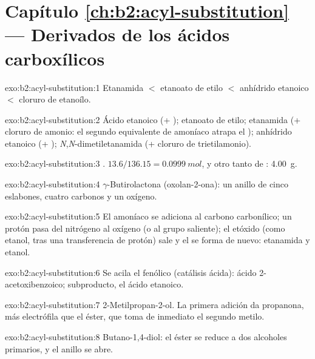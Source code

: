 \section*{Capítulo \ref{ch:b2:acyl-substitution} --- Derivados de los ácidos carboxílicos}

\begin{solution}{exo:b2:acyl-substitution:1}
Etanamida $<$ etanoato de etilo $<$ anhídrido etanoico $<$ cloruro de etanoílo.
\end{solution}

\begin{solution}{exo:b2:acyl-substitution:2}
Ácido etanoico (+ ); etanoato de etilo; etanamida (+ cloruro de amonio: el segundo equivalente
de amoníaco atrapa el ); anhídrido etanoico (+ );
\textit{N},\textit{N}-dimetiletanamida (+ cloruro de trietilamonio).
\end{solution}

\begin{solution}{exo:b2:acyl-substitution:3}
. $13.6/136.15 = \qty{0.0999}{mol}$, y otro tanto de
: \qty{4.00}{g}.
\end{solution}

\begin{solution}{exo:b2:acyl-substitution:4}
$\gamma$-Butirolactona (oxolan-2-ona): un anillo de cinco eslabones, cuatro carbonos y un oxígeno.
\end{solution}

\begin{solution}{exo:b2:acyl-substitution:5}
El amoníaco se adiciona al carbono carbonílico; un protón pasa del nitrógeno al oxígeno (o al
grupo saliente); el etóxido (como etanol, tras una transferencia de protón) sale y el  se forma de nuevo:
etanamida y etanol.
\end{solution}

\begin{solution}{exo:b2:acyl-substitution:6}
Se acila el  fenólico (catálisis ácida): ácido 2-acetoxibenzoico; subproducto, el ácido etanoico.
\end{solution}

\begin{solution}{exo:b2:acyl-substitution:7}
2-Metilpropan-2-ol. La primera adición da propanona, más electrófila que el éster, que
toma de inmediato el segundo metilo.
\end{solution}

\begin{solution}{exo:b2:acyl-substitution:8}
Butano-1,4-diol: el éster se reduce a dos alcoholes primarios, y el anillo se abre.
\end{solution}

